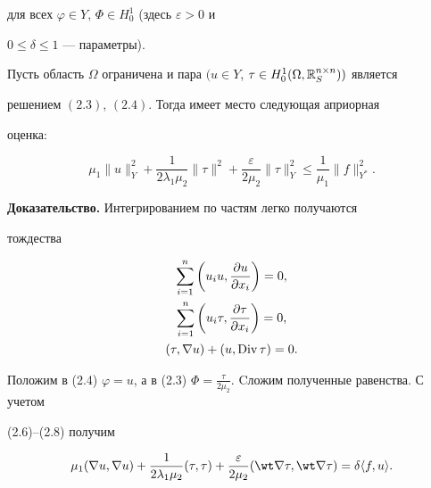 для всех $\varphi\in Y$, $\Phi\in H^1_0$ (здесь $\varepsilon>0$ и


$0\leq\delta\leq 1$ --- параметры).








\begin{lemnonum}


Пусть область $\Omega$ ограничена и пара $(u\in


Y$, $\tau\in H^1_0(\Omega,\Bbb{R}^{n \times n}_{S}))$ является


решением $(2.3)$, $(2.4)$. Тогда имеет место следующая априорная


оценка\/${:}$


\begin{equation}


\mu_1\|u\|^2_Y + \frac {1}{2\lambda_1\mu_2} \|\tau\|^2+\frac


{\varepsilon}{2\mu_2}\|\tau\|^2_Y \leq \frac


{1}{\mu_1}\|f\|^2_{Y^*}.


\end{equation}


\end{lemnonum}





{\bf Доказательство.} Интегрированием по частям легко получаются


тождества


\begin{gather}


\sum^n_{i=1}\bigg(u_i u,\frac {\partial u}{\partial x_i}\bigg)=0,\\


\sum^n_{i=1}\bigg(u_i \tau,\frac{\partial \tau}{\partial x_i}\bigg)=0,\\


(\tau, \nabla u)+(u, \Div\tau)=0.


\end{gather}


Положим в (2.4) $\varphi=u$, а в (2.3) $\Phi=\frac


{\tau}{2\mu_2}$. Cложим полученные равенства. С учетом


(2.6)--(2.8) получим


\begin{equation}


\mu_1(\nabla u, \nabla u)+ \frac {1}{2\lambda_1\mu_2}(\tau,


\tau)+\frac {\varepsilon}{2\mu_2}(\wt\nabla\tau,\wt\nabla\tau)=


\delta\langle f,u\rangle.


\end{equation}


